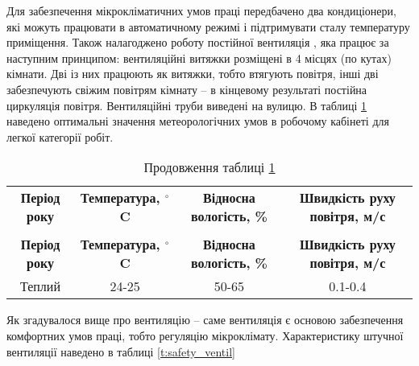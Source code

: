 \par Для забезпечення мікрокліматичних умов праці передбачено два кондиціонери, які можуть працювати в автоматичному режимі і підтримувати сталу температуру приміщення. Також налагоджено роботу постійної вентиляція , яка працює за наступним принципом: вентиляційні витяжки розміщені в 4 місцях (по кутах) кімнати. Дві із них працюють як витяжки, тобто втягують повітря, інші дві забезпечують свіжим повітрям кімнату -- в кінцевому результаті постійна циркуляція повітря. Вентиляційні труби виведені на вулицю. В таблиці \ref{t:safety_microclimate} наведено оптимальні значення метеорологічних умов в робочому кабінеті для легкої категорії робіт.


{\footnotesize
\begin{longtable}{|c|c|c|c|}
\captionsetup{justification=centering}
\caption{Оптимальні значення метеорологічних умов в робочому кабінеті для легкої категорії робіт}\label{t:safety_microclimate}\\
\hline
\multicolumn{1}{|c|}{\textbf{Період року}}&
\multicolumn{1}{c|}{\textbf{Температура, $^{\circ}$C}}&
\multicolumn{1}{c|}{\textbf{Відносна вологість, \%}}&
\multicolumn{1}{c|}{\textbf{Швидкість руху повітря, м/с}}\\ \hline

\endfirsthead
\caption*{\hfill Продовження таблиці \ref{t:safety_microclimate}}\\ \hline

\multicolumn{1}{|c|}{\textbf{Період року}}&
\multicolumn{1}{c|}{\textbf{Температура, $^{\circ}$C}}&
\multicolumn{1}{c|}{\textbf{Відносна вологість, \%}}&
\multicolumn{1}{c|}{\textbf{Швидкість руху повітря, м/с}}\\ \hline
\endhead
Теплий & 24-25 & 50-65 & 0.1-0.4 \\ \hline
\end{longtable}
}

\par Як згадувалося вище про вентиляцію -- саме вентиляція є основою забезпечення комфортних умов праці, тобто регуляцію мікроклімату. Характеристику штучної вентиляції наведено в таблиці \ref{t:safety_ventil}

